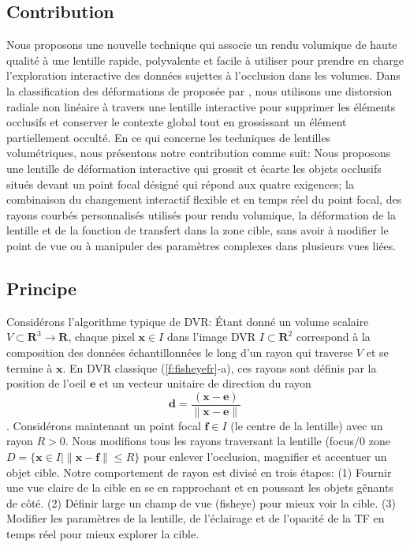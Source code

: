 \subsection{Contribution}
Nous proposons une nouvelle technique qui associe un rendu volumique de haute qualité à une lentille rapide, polyvalente et facile à utiliser pour prendre en charge l'exploration interactive des données sujettes à l'occlusion dans les volumes. Dans la classification des déformations de proposée par \cite{595268}, nous utilisons une distorsion radiale non linéaire à travers une lentille interactive pour supprimer les éléments occlusifs et conserver le contexte global tout en grossissant un élément partiellement occulté. En ce qui concerne les techniques de lentilles volumétriques, nous présentons notre contribution comme suit: Nous proposons une lentille de déformation interactive qui grossit et écarte les objets occlusifs situés devant un point focal désigné qui répond aux quatre exigences; la combinaison du changement interactif flexible et en temps réel du point focal, des rayons courbés personnalisés utilisés pour rendu volumique, la déformation de la lentille et de la fonction de transfert dans la zone cible, sans avoir à modifier le point de vue ou à manipuler des paramètres complexes dans plusieurs vues liées.

\subsection{Principe}

Considérons l’algorithme typique de DVR: Étant donné un volume scalaire $V \subset \mathbf{R}^3 \rightarrow \mathbf{R}$, chaque pixel $\mathbf{x} \in I$ dans l’image DVR $ I \subset \mathbf{R}^2$ correspond à la composition des données échantillonnées le long d'un rayon qui traverse $ V $ et se termine à $\mathbf {x}$. En DVR classique (\autoref{f:fisheyefr}-a), ces rayons sont définis par la position de l'oeil $ \mathbf{e}$ et un vecteur unitaire de direction du rayon
\begin{equation}
\mathbf{d} = \frac{(\mathbf{x} - \mathbf{e})}{\| \mathbf{x} - \mathbf{e} \|}
\end{equation}
. Considérons maintenant un point focal $\mathbf{f} \in I $ (le centre de la lentille) avec un rayon $ R> 0 $. Nous modifions tous les rayons traversant la lentille (focus/0 zone $D = \{\mathbf{x} \in I | \| \mathbf{x} - \mathbf{f} \| \leq R\}$ pour enlever l'occlusion, magnifier et accentuer un objet cible. Notre comportement de rayon est divisé en trois étapes: (1) Fournir une vue claire de la cible en se en rapprochant et en poussant les objets gênants de côté. (2) Définir large un champ de vue (fisheye) pour mieux voir la cible. (3) Modifier les paramètres de la lentille, de l'éclairage et de l'opacité de la TF en temps réel pour mieux explorer la cible.

